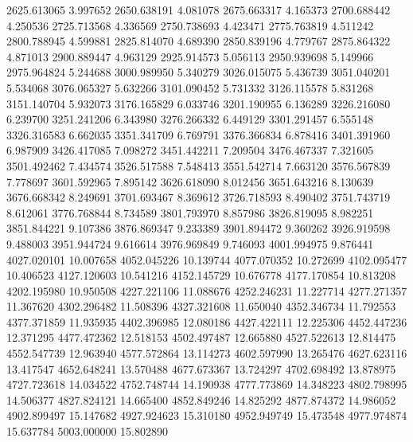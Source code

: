 {2625.613065 3.997652
2650.638191 4.081078
2675.663317 4.165373
2700.688442 4.250536
2725.713568 4.336569
2750.738693 4.423471
2775.763819 4.511242
2800.788945 4.599881
2825.814070 4.689390
2850.839196 4.779767
2875.864322 4.871013
2900.889447 4.963129
2925.914573 5.056113
2950.939698 5.149966
2975.964824 5.244688
3000.989950 5.340279
3026.015075 5.436739
3051.040201 5.534068
3076.065327 5.632266
3101.090452 5.731332
3126.115578 5.831268
3151.140704 5.932073
3176.165829 6.033746
3201.190955 6.136289
3226.216080 6.239700
3251.241206 6.343980
3276.266332 6.449129
3301.291457 6.555148
3326.316583 6.662035
3351.341709 6.769791
3376.366834 6.878416
3401.391960 6.987909
3426.417085 7.098272
3451.442211 7.209504
3476.467337 7.321605
3501.492462 7.434574
3526.517588 7.548413
3551.542714 7.663120
3576.567839 7.778697
3601.592965 7.895142
3626.618090 8.012456
3651.643216 8.130639
3676.668342 8.249691
3701.693467 8.369612
3726.718593 8.490402
3751.743719 8.612061
3776.768844 8.734589
3801.793970 8.857986
3826.819095 8.982251
3851.844221 9.107386
3876.869347 9.233389
3901.894472 9.360262
3926.919598 9.488003
3951.944724 9.616614
3976.969849 9.746093
4001.994975 9.876441
4027.020101 10.007658
4052.045226 10.139744
4077.070352 10.272699
4102.095477 10.406523
4127.120603 10.541216
4152.145729 10.676778
4177.170854 10.813208
4202.195980 10.950508
4227.221106 11.088676
4252.246231 11.227714
4277.271357 11.367620
4302.296482 11.508396
4327.321608 11.650040
4352.346734 11.792553
4377.371859 11.935935
4402.396985 12.080186
4427.422111 12.225306
4452.447236 12.371295
4477.472362 12.518153
4502.497487 12.665880
4527.522613 12.814475
4552.547739 12.963940
4577.572864 13.114273
4602.597990 13.265476
4627.623116 13.417547
4652.648241 13.570488
4677.673367 13.724297
4702.698492 13.878975
4727.723618 14.034522
4752.748744 14.190938
4777.773869 14.348223
4802.798995 14.506377
4827.824121 14.665400
4852.849246 14.825292
4877.874372 14.986052
4902.899497 15.147682
4927.924623 15.310180
4952.949749 15.473548
4977.974874 15.637784
5003.000000 15.802890
}\ccdquadraticfit

